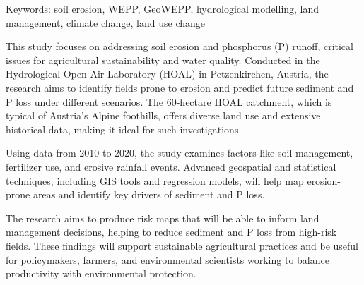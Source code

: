 Keywords: soil erosion, WEPP, GeoWEPP, hydrological modelling, land management, climate change, land use change
\newpage{}
{}
\begin{flushleft}







\end{flushleft}

\noindent

This study focuses on addressing soil erosion and phosphorus (P) runoff, critical issues for  agricultural sustainability and water quality. Conducted in the Hydrological Open Air  Laboratory (HOAL) in Petzenkirchen, Austria, the research aims to identify fields prone to  erosion and predict future sediment and P loss under different scenarios. The 60-hectare HOAL  catchment, which is typical of Austria’s Alpine foothills, offers diverse land use and extensive historical  data, making it ideal for such investigations. 

Using data from 2010 to 2020, the study examines factors like soil management, fertilizer use,  and erosive rainfall events. Advanced geospatial and statistical techniques, including GIS tools  and regression models, will help map erosion-prone areas and identify key drivers of sediment  and P loss. 

The research aims to produce risk maps that will be able to inform land management decisions, helping to  reduce sediment and P loss from high-risk fields. These findings will support sustainable  agricultural practices and be useful for policymakers, farmers, and environmental scientists  working to balance productivity with environmental protection. 

